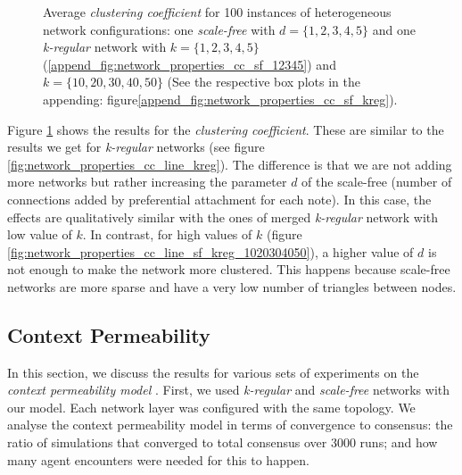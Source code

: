 \documentclass[preprint,number]{elsarticle}
\begin{document}
\begin{figure}[H]
          \begin{minipage}{0.9\textwidth}
            \vspace{0.2cm}
            \caption{Average \textit{clustering coefficient} for 100 instances of heterogeneous
              network configurations: one \textit{scale-free} with $d=\{1,2,3,4,5\}$ and one
              \textit{k-regular} network with $k=\{1,2,3,4,5\}$
              (\ref{append_fig:network_properties_cc_sf_12345}) and $k=\{10,20,30,40,50\} $ (See the
              respective box plots in the appending:
              figure\ref{append_fig:network_properties_cc_sf_kreg}).}
		\label{fig:network_properties_line_cc_sf_kreg}
              \end{minipage}
        \end{figure}

        \noindent Figure \ref{fig:network_properties_line_cc_sf_kreg} shows the results for the
        \textit{clustering coefficient}. These are similar to the results we get for
        \textit{k-regular} networks (see figure \ref{fig:network_properties_cc_line_kreg}). The
        difference is that we are not adding more networks but rather increasing the parameter $d$
        of the scale-free (number of connections added by preferential attachment for each
        note). In this case, the effects are qualitatively similar with the ones of merged
        \textit{k-regular} network with low value of $k$. In contrast, for high values of $k$
        (figure \ref{fig:network_properties_cc_line_sf_kreg_1020304050}), a higher value of $d$ is
        not enough to make the network more clustered. This happens because scale-free networks are
        more sparse and have a very low number of triangles between nodes.

        \subsection{Context Permeability}
        \label{sec:results:context_permeability}

        \noindent In this section, we discuss the results for various sets of experiments on the
        \textit{context permeability model} \cite{Antunes2007,Antunes2010}. First, we used
        \textit{k-regular} and \textit{scale-free} networks with our model. Each network layer was
        configured with the same topology. We analyse the context permeability model in terms of
        convergence to consensus: the ratio of simulations that converged to total consensus over
        3000 runs; and how many agent encounters were needed for this to happen.
\end{document}
